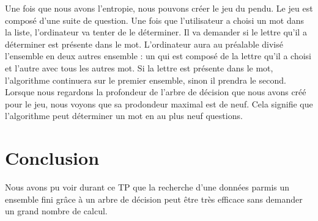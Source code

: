 \documentclass[a4paper,11pt]{article}
\begin{document}
  Une fois que nous avons l'entropie, nous pouvons créer le jeu du pendu. Le jeu est composé d'une suite de question.
  Une fois que l'utilisateur a choisi un mot dans la liste, l'ordinateur va tenter de le déterminer. Il va demander
  si le lettre qu'il a déterminer est présente dans le mot. L'ordinateur aura au préalable divisé l'ensemble en 
  deux autres ensemble : un qui est composé de la lettre qu'il a choisi et l'autre avec tous les autres mot. 
  Si la lettre est présente dans le mot, l'algorithme continuera sur le premier ensemble, sinon il prendra le second.\\
  
  Lorsque nous regardons la profondeur de l'arbre de décision que nous avons créé pour le jeu, nous voyons que 
  sa prodondeur maximal est de neuf. Cela signifie que l'algorithme peut déterminer un mot en au plus neuf
  questions.
  
  \section{Conclusion}
  Nous avons pu voir durant ce TP que la recherche d'une données parmis un ensemble fini grâce à un arbre de 
  décision peut être très efficace sans demander un grand nombre de calcul.
  
\end{document}
